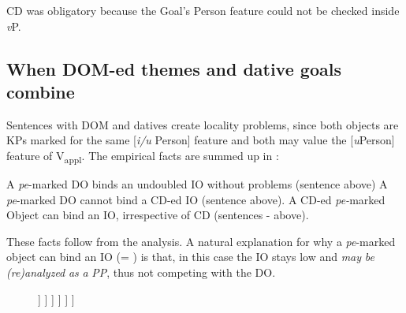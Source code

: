 \documentclass[output=paper,modfonts,nonflat,newtxmath]{langsci/langscibook}
\begin{document}
CD was obligatory because the Goal’s Person feature could not be checked inside \textit{v}P.

\subsection{{When} {DOM-ed} {themes} {and} {dative} {goals} {combine}}%

Sentences with DOM and datives create locality problems, since both objects are KPs marked for the same [\textit{i/u} Person] feature and both may value the [\textit{u}Person] feature of V\textsubscript{appl}. The empirical facts are summed up in :

\ea%
   \label{ex:cornilescu:30}
  	\ea A \textit{pe}-marked DO binds an undoubled IO without problems (sentence  above) \label{ex:cornilescu:30a}
  	\ex A \textit{pe}-marked DO cannot bind a CD-ed IO (sentence  above). \label{ex:cornilescu:30b}
  	\ex A CD-ed \textit{pe-}marked Object can bind an IO, irrespective of CD (sentences - above). \label{ex:cornilescu:30c}
   \z
   \z

 
These facts follow from the analysis. A natural explanation for why a \textit{pe}{}-marked object can bind an IO (= ) is that, in this case the IO stays low and \textit{may} \textit{be} \textit{(re)analyzed} \textit{as} \textit{a} \textit{PP}, thus not competing with the DO. 

\begin{figure}%
	\begin{forest}
		[\textit{v}P
			[\textit{v}\\
				 {[}\textit{u}Case:\_\_{]}
			]
			[${\alpha}$P
				[KP\textsubscript{DO}\\
					 {[}\textit{i}Pers{]}\\
					 {[}\textit{u}Case:\textsc{acc}{]}
				]
				[${\alpha}$P
					[${\alpha}$'
					]
					[VP
						[<KP\textsubscript{DO}>
						]
						[V'
							[V]
							[PP
								[P]
								[KP\textsubscript{IO}]
							]
						]
					]
				]
			]
		]
	\end{forest}
	\caption{\label{fig:cornilescu:11} \missingcaption}
\end{figure}
  
\end{document}
